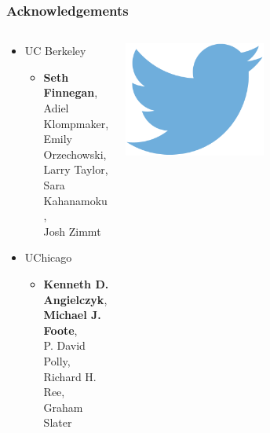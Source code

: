 \documentclass[aspectratio=169]{beamer}
\begin{document}
\begin{frame}
  \frametitle{Acknowledgements}
  \begin{columns}
    \begin{column}{0.5\textwidth}
      \begin{itemize}
        \item UC Berkeley
          \begin{itemize}
            \item \textbf{Seth Finnegan}, \\Adiel Klompmaker, \\Emily Orzechowski, \\Larry Taylor, \\Sara Kahanamoku, \\Josh Zimmt
          \end{itemize}
        \item UChicago
          \begin{itemize}
            \item \textbf{Kenneth D. Angielczyk}, \\\textbf{Michael J. Foote}, \\P. David Polly, \\Richard H. Ree, \\Graham Slater
          \end{itemize}
      \end{itemize}
    \end{column}
    \begin{column}{0.5\textwidth}
      \begin{center}
        \includegraphics[height=0.2\textheight,width=0.5\textwidth,keepaspectratio=true]{figure/twitter} 


\end{center}
\end{column}
\end{columns}
\end{frame}
\end{document}
